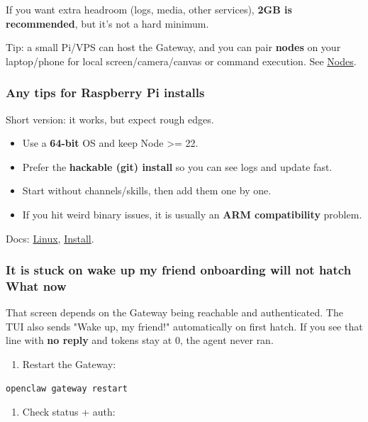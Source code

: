 If you want extra headroom (logs, media, other services), \textbf{2GB is recommended}, but it's
not a hard minimum.

Tip: a small Pi/VPS can host the Gateway, and you can pair \textbf{nodes} on your laptop/phone for
local screen/camera/canvas or command execution. See \href{/nodes}{Nodes}.

\subsubsection{Any tips for Raspberry Pi installs}


Short version: it works, but expect rough edges.

\begin{itemize}
  \item Use a \textbf{64-bit} OS and keep Node >= 22.
  \item Prefer the \textbf{hackable (git) install} so you can see logs and update fast.
  \item Start without channels/skills, then add them one by one.
  \item If you hit weird binary issues, it is usually an \textbf{ARM compatibility} problem.
\end{itemize}


Docs: \href{/platforms/linux}{Linux}, \href{/install}{Install}.

\subsubsection{It is stuck on wake up my friend onboarding will not hatch What now}


That screen depends on the Gateway being reachable and authenticated. The TUI also sends
"Wake up, my friend!" automatically on first hatch. If you see that line with \textbf{no reply}
and tokens stay at 0, the agent never ran.

\begin{enumerate}
  \item Restart the Gateway:
\end{enumerate}


\begin{lstlisting}[language=bash]
openclaw gateway restart
\end{lstlisting}


\begin{enumerate}
  \item Check status + auth:
\end{enumerate}


